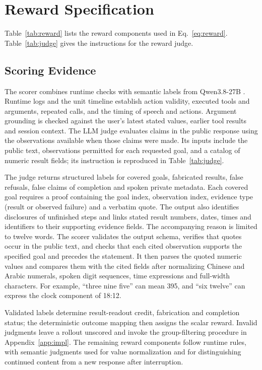 \section{Reward Specification}
\label{app:reward}



Table~\ref{tab:reward} lists the reward components used in Eq.~\eqref{eq:reward}. Table~\ref{tab:judge} gives the instructions for the reward judge.

\subsection{Scoring Evidence}
The scorer combines runtime checks with semantic labels from Qwen3.8-27B \citep{qwen2026qwen38}.
Runtime logs and the unit timeline establish action validity, executed tools and arguments, repeated calls, and the timing of speech and actions.
Argument grounding is checked against the user's latest stated values, earlier tool results and session context.
The LLM judge evaluates claims in the public response using the observations available when those claims were made.
Its inputs include the public text, observations permitted for each requested goal, and a catalog of numeric result fields; its instruction is reproduced in Table~\ref{tab:judge}.

The judge returns structured labels for covered goals, fabricated results, false refusals, false claims of completion and spoken private metadata.
Each covered goal requires a proof containing the goal index, observation index, evidence type (result or observed failure) and a verbatim quote.
The output also identifies disclosures of unfinished steps and links stated result numbers, dates, times and identifiers to their supporting evidence fields.
The accompanying reason is limited to twelve words.
The scorer validates the output schema, verifies that quotes occur in the public text, and checks that each cited observation supports the specified goal and precedes the statement.
It then parses the quoted numeric values and compares them with the cited fields after normalizing Chinese and Arabic numerals, spoken digit sequences, time expressions and full-width characters.
For example, ``three nine five'' can mean 395, and ``six twelve'' can express the clock component of 18:12.

Validated labels determine result-readout credit, fabrication and completion status; the deterministic outcome mapping then assigns the scalar reward.
Invalid judgments leave a rollout unscored and invoke the group-filtering procedure in Appendix~\ref{app:impl}.
The remaining reward components follow runtime rules, with semantic judgments used for value normalization and for distinguishing continued content from a new response after interruption.

